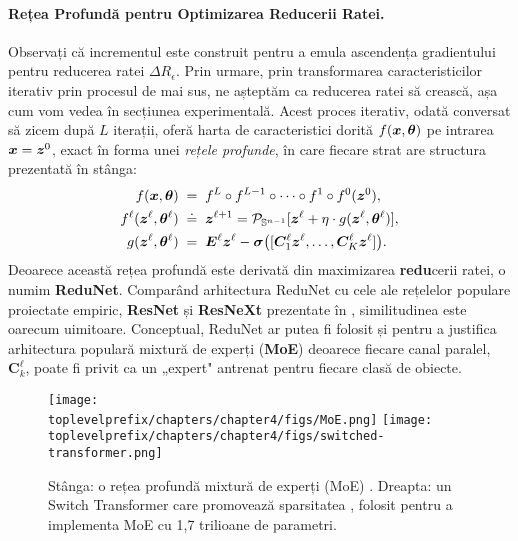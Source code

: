 \documentclass[../../book-main_ro.tex]{subfiles}
\begin{document}
\paragraph{Rețea Profundă pentru Optimizarea Reducerii Ratei.} Observați că incrementul este construit pentru a emula ascendența gradientului pentru reducerea ratei $\Delta R_\epsilon$. Prin urmare, prin transformarea caracteristicilor iterativ prin procesul de mai sus, ne așteptăm ca reducerea ratei să crească, așa cum vom vedea în secțiunea experimentală. Acest proces iterativ, odată conversat să zicem după $L$ iterații, oferă harta de caracteristici dorită $f(\bm{x}, \bm \theta)$ pe intrarea $\bm{x} = \bm{z}^0$, exact în forma unei {\em rețele profunde}, în care fiecare strat are structura prezentată în  stânga:
\begin{equation}\label{eqn:ReduNet}
\begin{aligned}
f(\bm{x}, \bm \theta)\; =&  \;\;f^L \circ f^{L-1} \circ  \cdots \circ f^1 \circ
    f^0(\bm{z}^0),  \\ 
f^\ell(\bm{z}^\ell, \bm \theta^\ell) \; \doteq & \;\; \bm{z}^{\ell+1} = \mathcal{P}_{\mathbb{S}^{n-1}}[\bm{z}^{\ell} + \eta\cdot g(\bm{z}^{\ell}, \bm \theta^{\ell})], \\
g(\bm{z}^{\ell}, \bm \theta^{\ell}) \; =&\;\; \bm E^{\ell} \bm{z}^{\ell} -  \bm \sigma\big([\bm{C}^{\ell}_{1} \bm{z}^{\ell}, \dots, \bm{C}^{\ell}_{K} \bm{z}^{\ell}]\big).
\end{aligned}
\end{equation}
Deoarece această rețea profundă este derivată din maximizarea \textbf{redu}cerii ratei, o numim \textbf{ReduNet}. Comparând arhitectura ReduNet cu cele ale rețelelor populare proiectate empiric, \textbf{ResNet} și \textbf{ResNeXt} prezentate în , similitudinea este oarecum uimitoare. Conceptual, ReduNet ar putea fi folosit și pentru a justifica arhitectura populară mixtură de experți (\textbf{MoE}) \cite{MoE} deoarece fiecare canal paralel, $\bm{C}^{\ell}_k$, poate fi privit ca un „expert" antrenat pentru fiecare clasă de obiecte.

\begin{figure}[t]
    \centering
    \texttt{[image: \\toplevelprefix/chapters/chapter4/figs/MoE.png]} \hspace{5mm}
    \texttt{[image: \\toplevelprefix/chapters/chapter4/figs/switched-transformer.png]}
    \caption{Stânga: o rețea profundă mixtură de experți (MoE) \cite{MoE}. Dreapta: un Switch Transformer care promovează sparsitatea \cite{Fedus-2022}, folosit pentru a implementa MoE cu 1,7 trilioane de parametri.}
    \label{fig:enter-label}
\end{figure}
\end{document}
